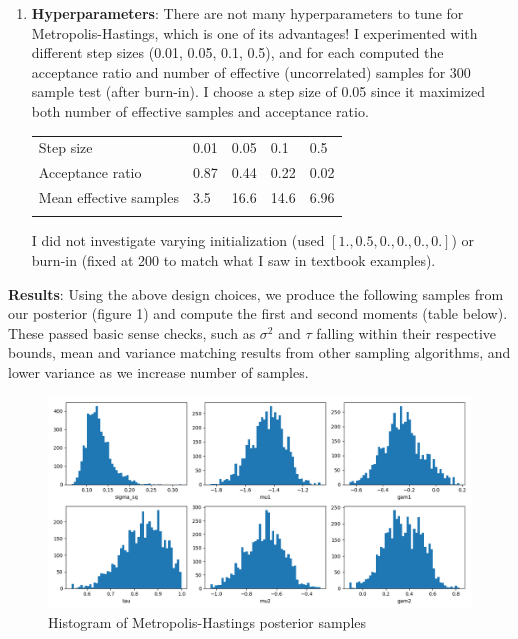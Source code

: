 \documentclass[12pt,letterpaper,twoside]{article}
\begin{document}
\begin{enumerate}[label=(\alph*)]
\item \textbf{Hyperparameters}: There are not many hyperparameters to 
tune for Metropolis-Hastings, which is one of its advantages! I 
experimented with different step sizes (0.01, 0.05, 0.1, 0.5), 
and for each computed the acceptance ratio and number of 
effective (uncorrelated) samples for 300 sample test (after 
burn-in). I choose a step size of 0.05 since it maximized 
both number of effective samples and acceptance ratio.

\begin{table}[H]
    \centering
    \begin{tabular}{lllll}
        Step size                   & 0.01 & 0.05  & 0.1   & 0.5   \\
        Acceptance ratio            & 0.87 & 0.44  & 0.22  & 0.02  \\
        Mean effective samples      & 3.5  & 16.6  & 14.6  & 6.96  \\
                                    &      &       &       &         
    \end{tabular}
\end{table}

I did not investigate varying initialization (used $[1., 0.5, 0., 0., 0., 0.]$)
or burn-in (fixed at 200 to match what I saw in textbook examples).
\end{enumerate}

\textbf{Results}: Using the above design choices, we produce the following 
samples from our posterior (figure 1) and compute the first and second 
moments (table below). These passed basic sense checks, such as $\sigma^2$ 
and $\tau$ falling within their respective bounds, mean and variance matching 
results from other sampling algorithms, and lower variance as we increase number 
of samples.
\begin{figure}[H]
    \centering
    \includegraphics[scale=0.55]{mh_sampled_histogram.png}
    \caption{Histogram of Metropolis-Hastings posterior samples}
\end{figure}
\end{document}
